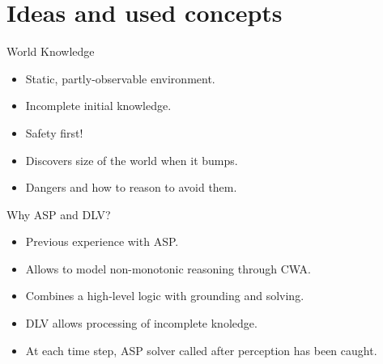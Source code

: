 \documentclass[smaller,dvipsnames,ratio=169]{beamer}
\begin{document}
  \section{Ideas and used concepts}

\begin{comment}
  \begin{frame}{Hybrid Agent}
  	
      \begin{tabular}{lll}
        \textbf{Component} & \textbf{Task} & \textbf{Language} \\
        Perceptor & Retrieves what is perceived in current location & Python \\
        Long-term Memory & Stores information about what has been discovered and done & Python \\
        Action Graph & Searches for optimal actions to be taken & Python \\
        Working Memory & Stores information needed to decide next action & Python \\
        Planner & Infers new knowledge and decides next action & ASP \\ 
      \end{tabular}
  
  \end{frame}
   
\end{comment}


 \begin{frame}{World Knowledge}
	
	  \begin{itemize}
		\item Static, partly-observable environment.
		\item Incomplete initial knowledge.
		\item Safety first!
		\item Discovers size of the world when it bumps. 
		\item Dangers and how to reason to avoid them. 
	  \end{itemize}
 \end{frame}

 \begin{frame}{Why ASP and DLV?}
	\begin{itemize}
		\item Previous experience with ASP.
		\item Allows to model non-monotonic reasoning through CWA. 
		\item Combines a high-level
		logic with grounding and solving. 
		\item DLV allows processing of incomplete knoledge. 
		\item At each time step, ASP solver called after perception has been caught.
		
	\end{itemize}
 \end{frame}
\end{document}
